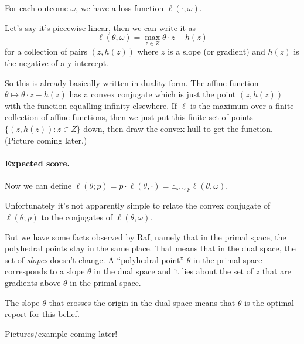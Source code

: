 \documentclass[12pt]{article}
\begin{document}
For each outcome $\omega$, we have a loss function $\ell(\cdot, \omega)$.

Let's say it's piecewise linear, then we can write it as
  \[ \ell(\theta, \omega) = \max_{z \in Z} \theta \cdot z - h(z) \]
for a collection of pairs $(z, h(z))$ where $z$ is a slope (or gradient) and $h(z)$ is the negative of a y-intercept.

So this is already basically written in duality form.
The affine function $\theta \mapsto \theta \cdot z - h(z)$ has a convex conjugate which is just the point $(z, h(z))$ with the function equalling infinity elsewhere.
If $\ell$ is the maximum over a finite collection of affine functions, then we just put this finite set of points $\{(z,h(z)) : z \in Z\}$ down, then draw the convex hull to get the function.
(Picture coming later.)

\paragraph{Expected score.}
Now we can define $\ell(\theta ; p) = p \cdot \ell(\theta, \cdot) = \mathbb{E}_{\omega \sim p} \ell(\theta, \omega)$.

Unfortunately it's not apparently simple to relate the convex conjugate of $\ell(\theta; p)$ to the conjugates of $\ell(\theta, \omega)$.

But we have some facts observed by Raf, namely that in the primal space, the polyhedral points stay in the same place.
That means that in the dual space, the set of \emph{slopes} doesn't change.
A ``polyhedral point'' $\theta$ in the primal space corresponds to a slope $\theta$ in the dual space and it lies about the set of $z$ that are gradients above $\theta$ in the primal space.

The slope $\theta$ that crosses the origin in the dual space means that $\theta$ is the optimal report for this belief.

Pictures/example coming later!
\end{document}
